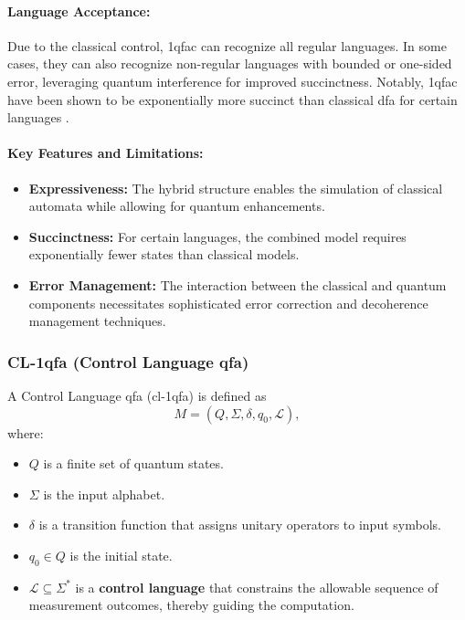 \paragraph{Language Acceptance:}  
Due to the classical control, \gls{1qfac} can recognize all regular languages. In some cases, they can also recognize non-regular languages with bounded or one-sided error, leveraging quantum interference for improved succinctness. Notably, \gls{1qfac} have been shown to be exponentially more succinct than classical \gls{dfa} for certain languages \cite{bianchi2014size}.

\paragraph{Key Features and Limitations:}
\begin{itemize}
    \item \textbf{Expressiveness:} The hybrid structure enables the simulation of classical automata while allowing for quantum enhancements.
    \item \textbf{Succinctness:} For certain languages, the combined model requires exponentially fewer states than classical models.
    \item \textbf{Error Management:} The interaction between the classical and quantum components necessitates sophisticated error correction and decoherence management techniques.
\end{itemize}

\subsubsection{CL-1qfa (Control Language qfa)}
\label{sssec:cl-1qfa}
\begin{definition}[CL-1qfa]
A Control Language qfa (\gls{cl-1qfa}) is defined as 
\[
M = (Q, \Sigma, \delta, q_0, \mathcal{L}),
\]
where:
\begin{itemize}
    \item \( Q \) is a finite set of quantum states.
    \item \( \Sigma \) is the input alphabet.
    \item \(\delta\) is a transition function that assigns unitary operators to input symbols.
    \item \( q_0 \in Q \) is the initial state.
    \item \( \mathcal{L} \subseteq \Sigma^* \) is a \textbf{control language} that constrains the allowable sequence of measurement outcomes, thereby guiding the computation.
\end{itemize}
\end{definition}

